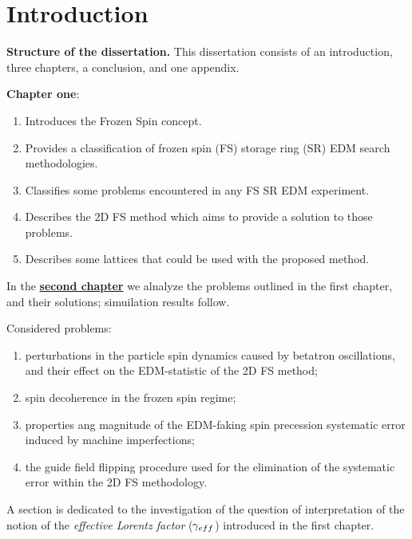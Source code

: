 \chapter*{Introduction}                         %


\textbf{Structure of the dissertation.} This dissertation consists of an introduction, three chapters,
a conclusion, and one appendix.

\textbf{Chapter one}: 
\begin{enumerate}[(1)]
	\item Introduces the Frozen Spin concept.
	\item Provides a classification of frozen spin (FS) storage ring (SR) EDM search methodologies.
	\item Classifies some problems encountered in any FS SR EDM experiment.
	\item Describes the 2D FS method which aims to provide a solution to those problems.
	\item Describes some lattices that could be used with the proposed method.
\end{enumerate}

In the \underline{\textbf{second chapter}} we alnalyze the problems outlined in the first chapter, and their solutions; simuilation results follow. 

Considered problems:
\begin{enumerate}[(1)]
	\item perturbations in the particle spin dynamics caused by betatron oscillations, and their effect on the EDM-statistic of the 2D FS method;
	\item spin decoherence in the frozen spin regime;
	\item properties ang magnitude of the EDM-faking spin precession systematic error induced by machine imperfections;
	\item the guide field flipping procedure used for the elimination of the systematic error within the 2D FS methodology.
\end{enumerate}

A section is dedicated to the investigation of the question of interpretation of the notion of the \emph{effective Lorentz factor} ($\gamma_{eff}$) introduced in the first chapter. 

